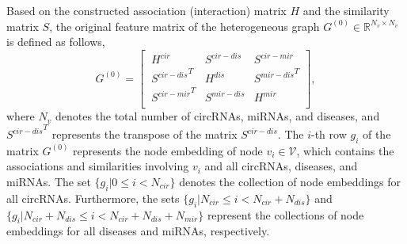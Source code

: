 \documentclass[journal=jcisd8,manuscript=article]{achemso}
\begin{document}
Based on the constructed association (interaction) matrix $H$ and the similarity matrix $S$, the original feature matrix of the heterogeneous graph $G^{(0)} \in \mathbb{R}^{N_v\times N_v}$ is defined as follows,
\begin{equation}
G^{(0)} = \left[\ \begin{array}{lll}
H^{cir} & S^{cir-dis} & S^{cir-mir}\\
{S^{cir-dis}}^T & H^{dis} & {S^{mir-dis}}^T\\
{S^{cir-mir}}^T & S^{mir-dis} & H^{mir}\\
\end{array} \right],
\end{equation}
where $N_v$ denotes the total number of circRNAs, miRNAs, and diseases, and ${S^{cir-dis}}^T$ represents the transpose of the matrix $S^{cir-dis}$. The $i$-th row $g_i$ of the matrix $G^{(0)}$ represents the node embedding of node $v_i \in \mathcal{V}$, which contains the associations and similarities involving $v_i$ and all circRNAs, diseases, and miRNAs. The set $\{g_i | 0 \leqslant i < N_{cir}\}$ denotes the collection of node embeddings for all circRNAs. Furthermore, the sets $\{g_i | N_{cir} \leqslant i < N_{cir} + N_{dis}\}$ and $\{g_i | N_{cir} + N_{dis} \leqslant i < N_{cir} + N_{dis} + N_{mir}\}$ represent the collections of node embeddings for all diseases and miRNAs, respectively.
\vspace{-0.5cm}
\end{document}
